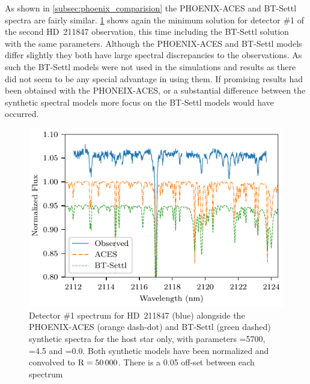 As shown in \cref{subsec:phoenix_comparision} the {PHOENIX-ACES} and {BT-Settl} spectra are fairly similar.
\cref{fig:hd211847-models} shows again the minimum \textchisquared{} solution for detector \#1 of the second {HD~211847} observation, this time including the {BT-Settl} solution with the same parameters.
Although the {PHOENIX-ACES} and {BT-Settl} models differ slightly they both have large spectral discrepancies to the observations.
As such the {BT-Settl} models were not used in the \textchisquared{} simulations and results as there did not seem to be any special advantage in using them.
If promising results had been obtained with the {PHONEIX-ACES}, or a substantial difference between the synthetic spectral models more focus on the {BT-Settl} models would have occurred.


\begin{figure}
    \centering
    \includegraphics[width=\hsize]{figures/companion_recovery/HD211847_ACES_BTSettl.pdf}
    \caption{Detector \#1 spectrum for {HD~211847} (blue) alongside the {PHOENIX-ACES} (orange dash-dot) and {BT-Settl} (green dashed) synthetic spectra for the host star only, with parameters \Teff{}=5700\K{}, \Logg{}=4.5 and \feh{}=0.0.
        Both synthetic models have been normalized and convolved to \(\rm R=50\,000\).
        There is a 0.05 off-set between each spectrum}
    \label{fig:hd211847-models}
\end{figure}


